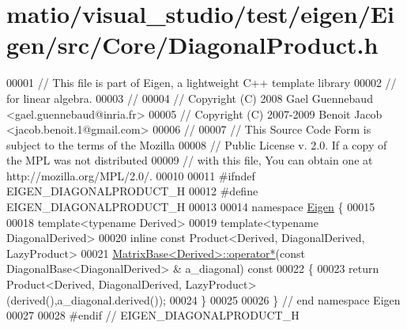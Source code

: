 \hypertarget{matio_2visual__studio_2test_2eigen_2_eigen_2src_2_core_2_diagonal_product_8h_source}{}\section{matio/visual\+\_\+studio/test/eigen/\+Eigen/src/\+Core/\+Diagonal\+Product.h}
\label{matio_2visual__studio_2test_2eigen_2_eigen_2src_2_core_2_diagonal_product_8h_source}

\begin{DoxyCode}
00001 \textcolor{comment}{// This file is part of Eigen, a lightweight C++ template library}
00002 \textcolor{comment}{// for linear algebra.}
00003 \textcolor{comment}{//}
00004 \textcolor{comment}{// Copyright (C) 2008 Gael Guennebaud <gael.guennebaud@inria.fr>}
00005 \textcolor{comment}{// Copyright (C) 2007-2009 Benoit Jacob <jacob.benoit.1@gmail.com>}
00006 \textcolor{comment}{//}
00007 \textcolor{comment}{// This Source Code Form is subject to the terms of the Mozilla}
00008 \textcolor{comment}{// Public License v. 2.0. If a copy of the MPL was not distributed}
00009 \textcolor{comment}{// with this file, You can obtain one at http://mozilla.org/MPL/2.0/.}
00010 
00011 \textcolor{preprocessor}{#ifndef EIGEN\_DIAGONALPRODUCT\_H}
00012 \textcolor{preprocessor}{#define EIGEN\_DIAGONALPRODUCT\_H}
00013 
00014 \textcolor{keyword}{namespace }\hyperlink{namespace_eigen}{Eigen} \{ 
00015 
00018 \textcolor{keyword}{template}<\textcolor{keyword}{typename} Derived>
00019 \textcolor{keyword}{template}<\textcolor{keyword}{typename} DiagonalDerived>
00020 \textcolor{keyword}{inline} \textcolor{keyword}{const} Product<Derived, DiagonalDerived, LazyProduct>
00021 \hyperlink{group___core___module_ae2d220efbf7047f0894787888288cfcc}{MatrixBase<Derived>::operator*}(\textcolor{keyword}{const} DiagonalBase<DiagonalDerived> &
      a\_diagonal)\textcolor{keyword}{ const}
00022 \textcolor{keyword}{}\{
00023   \textcolor{keywordflow}{return} Product<Derived, DiagonalDerived, LazyProduct>(derived(),a\_diagonal.derived());
00024 \}
00025 
00026 \} \textcolor{comment}{// end namespace Eigen}
00027 
00028 \textcolor{preprocessor}{#endif // EIGEN\_DIAGONALPRODUCT\_H}
\end{DoxyCode}
